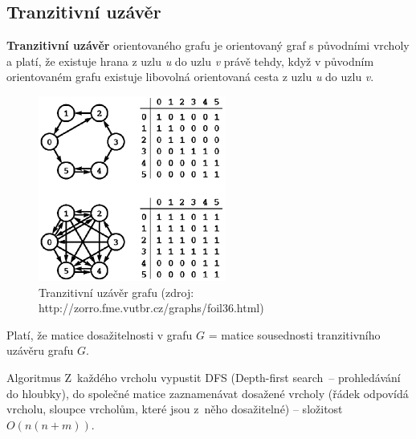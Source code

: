 \subsection{Tranzitivní uzávěr}

\begin{definice}
  \textbf{Tranzitivní uzávěr} orientovaného grafu je orientovaný graf s
  původními vrcholy a platí, že existuje hrana z uzlu \emph{u} do uzlu \emph{v}
  právě tehdy, když v původním orientovaném grafu existuje libovolná orientovaná
  cesta z uzlu \emph{u} do uzlu \emph{v}.
\end{definice}

\begin{figure}[!ht]
  \begin{center}
    \includegraphics[scale=.7]{informatika/teoreticka_informatika/obrazky/tranzuzaver.png}
    \caption{Tranzitivní uzávěr grafu (zdroj: http://zorro.fme.vutbr.cz/graphs/foil36.html)}
  \end{center}
\end{figure}

\begin{poznamka}
  Platí, že matice dosažitelnosti v grafu $G$ = matice sousednosti tranzitivního
  uzávěru grafu $G$.
\end{poznamka}

\begin{obecne}{Algoritmus}
Z každého vrcholu vypustit DFS (Depth-first search~-- prohledávání do hloubky), do společné matice zaznamenávat dosažené vrcholy (řádek odpovídá vrcholu, sloupce vrcholům, které jsou z něho dosažitelné) -- složitost $O(n(n+m))$.
\end{obecne}

